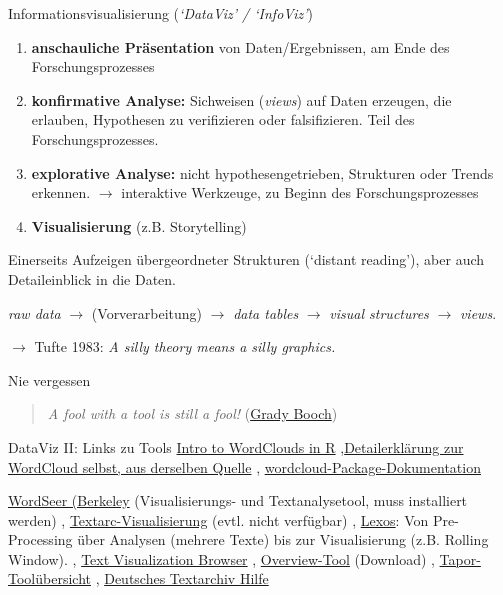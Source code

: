 \documentclass[10pt,a4paper]{article}
\begin{document}
\begin{multicols}{3}
\begin{textbox}{Informationsvisualisierung (\emph{`DataViz' / `InfoViz'})}
\bigskip

\begin{enumerate}
\item \textbf{anschauliche Präsentation} von Daten/Ergebnissen, am Ende des Forschungsprozesses
\item \textbf{konfirmative Analyse:} Sichweisen (\emph{views}) auf Daten erzeugen, die erlauben, Hypothesen zu verifizieren oder falsifizieren. Teil des Forschungsprozesses.
\item \textbf{explorative Analyse:} nicht hypothesengetrieben, Strukturen oder Trends erkennen. $\to$ interaktive Werkzeuge, zu Beginn des Forschungsprozesses
\item \textbf{Visualisierung} (z.B. Storytelling)
\end{enumerate}

 Einerseits Aufzeigen übergeordneter Strukturen (`distant reading'), aber auch Detaileinblick in die Daten.

\emph{raw data} $\to$ (Vorverarbeitung) $\to$ \emph{data tables} $\to$ \emph{visual structures} $\to$ \emph{views}.

$\to$ Tufte 1983: \emph{A silly theory means a silly graphics.}
\end{textbox}

\begin{textbox}{Nie vergessen}

\begin{quote}
        \emph{A fool with a tool is still a fool!} (\href{https://en.wikiquote.org/wiki/Talk:Grady_Booch}{Grady Booch})
    \end{quote}

\end{textbox}

\begin{textbox}{DataViz II: Links zu Tools}
\href{http://www.sthda.com/english/wiki/text-mining-and-word-cloud-fundamentals-in-r-5-simple-steps-you-should-know}{Intro to WordClouds in R} \sep \href{http://www.sthda.com/english/wiki/word-cloud-generator-in-r-one-killer-function-to-do-everything-you-need}{Detailerklärung zur WordCloud selbst, aus derselben Quelle} \sep
\href{https://cran.r-project.org/web/packages/wordcloud/wordcloud.pdf}{wordcloud-Package-Dokumentation}

\href{http://wordseer.berkeley.edu/}{WordSeer (Berkeley} (Visualisierungs- und Textanalysetool, muss installiert werden) \sep
\href{https://www.textarc.org/}{Textarc-Visualisierung} (evtl. nicht verfügbar) \sep 
\href{http://lexos.wheatoncollege.edu/}{Lexos}: Von Pre-Processing über Analysen (mehrere Texte) bis zur Visualisierung (z.B. Rolling Window). \sep
\href{http://textvis.lnu.se/}{Text Visualization Browser} \sep 
\href{https://www.overviewdocs.com/}{Overview-Tool} (Download) \sep 
\href{http://tapor.ca}{Tapor-Toolübersicht} \sep
\href{http://www.deutschestextarchiv.de/doku/DDC-suche_hilfe}{Deutsches Textarchiv Hilfe}
\end{textbox}





\end{multicols}
\end{document}
